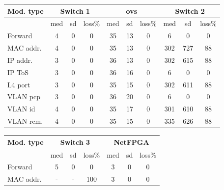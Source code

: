 
\begin{table}[tb]
\begin{flushleft}
        \begin{tabular}[t]{ |l | c | c | c || c | c | c  || c | c | c | }
          \hline                       
          Mod. type & \multicolumn{3}{|c|}{Switch 1} & \multicolumn{3}{|c|}{ovs} &
          \multicolumn{3}{|c|}{Switch 2} \\ 
          \hline                       
          & med & sd & loss\%  & med & sd & loss\% & med & sd & loss\%\\
          \hline  
          Forward & 4 & 0 & 0 & 35 & 13 & 0& 6 & 0 & 0 \\
          \hline  
          MAC addr. & 4 & 0 & 0 & 35 & 13 & 0& 302 & 727 & 88\\
          \hline  
          IP addr. & 3 & 0 & 0 & 36 & 13 & 0 & 302 & 615 & 88\\
          \hline  
          IP ToS & 3 & 0 & 0 & 36 & 16 & 0 & 6 & 0 & 0\\
          \hline  
          L4 port & 3 & 0 & 0 & 35 & 15 & 0 & 302 & 611 &  88\\
          \hline  
          VLAN pcp & 3 & 0 & 0 & 36 & 20 & 0 & 6 & 0 & 0\\
          \hline  
          VLAN id & 4 & 0 & 0 & 35 & 17 & 0 & 301 & 610 & 88\\
          \hline  
          VLAN rem. & 4 & 0 & 0 & 35 & 15 & 0 & 335 & 626 & 88\\
      \hline
    \end{tabular}
   \begin{tabular}[t]{ |l | c | c | c || c | c | c | }
          \hline                       
          Mod. type & \multicolumn{3}{|c|}{Switch 3} & \multicolumn{3}{|c|}{NetFPGA}\\ 
          \hline                       
          & med & sd & loss\%  & med & sd & loss\% \\
          \hline  
          Forward & 5 & 0 & 0 & 3 & 0 & 0 \\
          \hline  
          MAC addr. & - & - & 100 & 3 & 0 & 0 \\

\end{tabular}
\end{flushleft}
\end{table}
